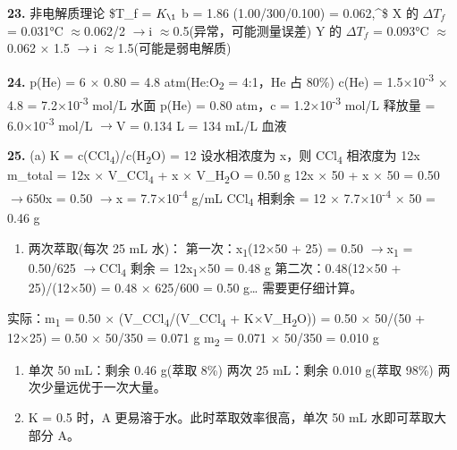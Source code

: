 \documentclass[a4paper,11pt]{ctexart}
\providecommand{\tightlist}{\setlength{\itemsep}{0pt}\setlength{\parskip}{0pt}}
\newcommand{\箭}{\ensuremath{\rightarrow}}
\newcommand{\左箭}{\ensuremath{\leftarrow}}
\newcommand{\上箭}{\ensuremath{\uparrow}}
\newcommand{\下箭}{\ensuremath{\downarrow}}
\newcommand{\衡}{\ensuremath{\rightleftharpoons}}
\newcommand{\双箭}{\ensuremath{\leftrightarrow}}
\newcommand{\约等于}{\ensuremath{\approx}}
\newcommand{\小于等于}{\ensuremath{\leq}}
\newcommand{\大于等于}{\ensuremath{\geq}}
\newcommand{\不等于}{\ensuremath{\neq}}
\newcommand{\西格马}{\ensuremath{\sigma}}
\newcommand{\派}{\ensuremath{\pi}}
\begin{document}
\textbf{23.} 非电解质理论 \$\Delta T\_f = \(K_{\1}\) \times b = 1.86 \times (1.00/300/0.100) = 0.062,\^{}\circ{}\$
X 的 \(\Delta T_f\) = 0.031°C \约等于 0.062/2 \箭 i \约等于 0.5(异常，可能测量误差)
Y 的 \(\Delta T_f\) = 0.093°C \约等于 0.062 × 1.5 \箭 i \约等于 1.5(可能是弱电解质)

\textbf{24.} p(He) = 6 × 0.80 = 4.8 atm(He:O\textsubscript{2} = 4:1，He 占 80\%)
c(He) = 1.5×10\textsuperscript{-3} × 4.8 = 7.2×10\textsuperscript{-3} mol/L
水面 p(He) = 0.80 atm，c = 1.2×10\textsuperscript{-3} mol/L
释放量 = 6.0×10\textsuperscript{-3} mol/L \箭 V = 0.134 L = 134 mL/L 血液

\textbf{25.}
(a) K = c(CCl\textsubscript{4})/c(H\textsubscript{2}O) = 12
设水相浓度为 x，则 CCl\textsubscript{4} 相浓度为 12x
m\_total = 12x × V\_CCl\textsubscript{4} + x × V\_H\textsubscript{2}O = 0.50 g
12x × 50 + x × 50 = 0.50 \箭 650x = 0.50 \箭 x = 7.7×10\textsuperscript{-4} g/mL
CCl\textsubscript{4} 相剩余 = 12 × 7.7×10\textsuperscript{-4} × 50 = 0.46 g

\begin{enumerate}
\def\labelenumi{(\alph{enumi})}
\setcounter{enumi}{1}
\tightlist
\item
  两次萃取(每次 25 mL 水)：
  第一次：x\textsubscript{1}(12×50 + 25) = 0.50 \箭 x\textsubscript{1} = 0.50/625 \箭 CCl\textsubscript{4} 剩余 = 12x\textsubscript{1}×50 = 0.48 g
  第二次：0.48(12×50 + 25)/(12×50) = 0.48 × 625/600 = 0.50 g\ldots{} 需要更仔细计算。
\end{enumerate}

实际：m\textsubscript{1} = 0.50 × (V\_CCl\textsubscript{4}/(V\_CCl\textsubscript{4} + K×V\_H\textsubscript{2}O)) = 0.50 × 50/(50 + 12×25) = 0.50 × 50/350 = 0.071 g
m\textsubscript{2} = 0.071 × 50/350 = 0.010 g

\begin{enumerate}
\def\labelenumi{(\alph{enumi})}
\setcounter{enumi}{2}
\item
  单次 50 mL：剩余 0.46 g(萃取 8\%)
  两次 25 mL：剩余 0.010 g(萃取 98\%)
  两次少量远优于一次大量。
\item
  K = 0.5 时，A 更易溶于水。此时萃取效率很高，单次 50 mL 水即可萃取大部分 A。
\end{enumerate}
\end{document}

